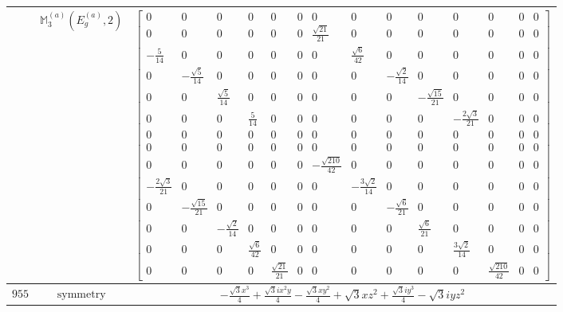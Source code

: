 \documentclass[fleqn,8pt,landscape]{jsarticle}
\begin{document}
\begin{longtable}{ccc}
$  $ & $ \mathbb{M}_{3}^{(a)}(E_{g}^{(a)},2) $ & $ \begin{bmatrix} 0 & 0 & 0 & 0 & 0 & 0 & 0 & 0 & 0 & 0 & 0 & 0 & 0 & 0 \\ 0 & 0 & 0 & 0 & 0 & 0 & \frac{\sqrt{21}}{21} & 0 & 0 & 0 & 0 & 0 & 0 & 0 \\ - \frac{5}{14} & 0 & 0 & 0 & 0 & 0 & 0 & \frac{\sqrt{6}}{42} & 0 & 0 & 0 & 0 & 0 & 0 \\ 0 & - \frac{\sqrt{5}}{14} & 0 & 0 & 0 & 0 & 0 & 0 & - \frac{\sqrt{2}}{14} & 0 & 0 & 0 & 0 & 0 \\ 0 & 0 & \frac{\sqrt{5}}{14} & 0 & 0 & 0 & 0 & 0 & 0 & - \frac{\sqrt{15}}{21} & 0 & 0 & 0 & 0 \\ 0 & 0 & 0 & \frac{5}{14} & 0 & 0 & 0 & 0 & 0 & 0 & - \frac{2 \sqrt{3}}{21} & 0 & 0 & 0 \\ 0 & 0 & 0 & 0 & 0 & 0 & 0 & 0 & 0 & 0 & 0 & 0 & 0 & 0 \\ 0 & 0 & 0 & 0 & 0 & 0 & 0 & 0 & 0 & 0 & 0 & 0 & 0 & 0 \\ 0 & 0 & 0 & 0 & 0 & 0 & - \frac{\sqrt{210}}{42} & 0 & 0 & 0 & 0 & 0 & 0 & 0 \\ - \frac{2 \sqrt{3}}{21} & 0 & 0 & 0 & 0 & 0 & 0 & - \frac{3 \sqrt{2}}{14} & 0 & 0 & 0 & 0 & 0 & 0 \\ 0 & - \frac{\sqrt{15}}{21} & 0 & 0 & 0 & 0 & 0 & 0 & - \frac{\sqrt{6}}{21} & 0 & 0 & 0 & 0 & 0 \\ 0 & 0 & - \frac{\sqrt{2}}{14} & 0 & 0 & 0 & 0 & 0 & 0 & \frac{\sqrt{6}}{21} & 0 & 0 & 0 & 0 \\ 0 & 0 & 0 & \frac{\sqrt{6}}{42} & 0 & 0 & 0 & 0 & 0 & 0 & \frac{3 \sqrt{2}}{14} & 0 & 0 & 0 \\ 0 & 0 & 0 & 0 & \frac{\sqrt{21}}{21} & 0 & 0 & 0 & 0 & 0 & 0 & \frac{\sqrt{210}}{42} & 0 & 0 \end{bmatrix} $ \\ \hline
$ 955 $ & $ \text{symmetry} $ & $ - \frac{\sqrt{3} x^{3}}{4} + \frac{\sqrt{3} i x^{2} y}{4} - \frac{\sqrt{3} x y^{2}}{4} + \sqrt{3} x z^{2} + \frac{\sqrt{3} i y^{3}}{4} - \sqrt{3} i y z^{2} $ \\

\end{longtable}
\end{document}
